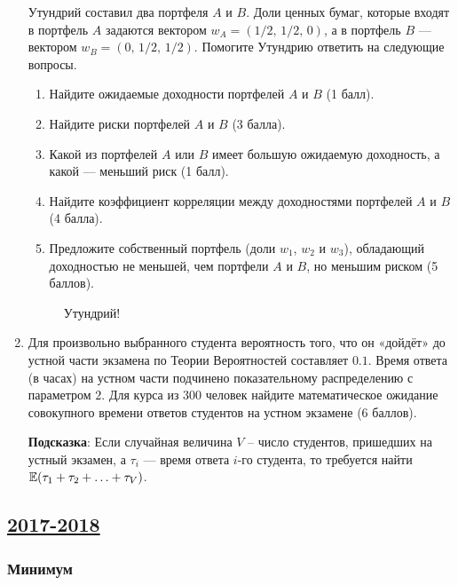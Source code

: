 \begin{enumerate}
Утундрий составил два портфеля $A$ и $B$. Доли ценных бумаг, которые входят
в портфель $A$ задаются вектором $w_A = (1/2, \, 1/2, \, 0)$, а в портфель $B$ —
вектором $w_B = (0, \, 1/2, \, 1/2)$.
Помогите Утундрию ответить на следующие вопросы.
\begin{enumerate}
  \item Найдите ожидаемые доходности портфелей $A$ и $B$ (1 балл).
  \item Найдите риски портфелей $A$ и $B$ (3 балла).
  \item Какой из портфелей $A$ или $B$ имеет большую ожидаемую доходность,
  а какой — меньший риск (1 балл).
  \item Найдите коэффициент корреляции между доходностями портфелей $A$ и $B$ (4 балла).
  \item Предложите собственный портфель (доли $w_{1}$, $w_{2}$ и $w_{3}$),
  обладающий доходностью не меньшей, чем портфели $A$ и $B$, но меньшим риском (5 баллов).
\end{enumerate}

\begin{figure}[h]
    \noindent{}
    \caption{Утундрий!}
    \label{ut2018}
\end{figure}


    \item Для произвольно выбранного студента вероятность того, что он «дойдёт»
    до устной части экзамена по Теории Вероятностей составляет $0.1$. Время
    ответа (в часах) на устном части подчинено показательному распределению с
    параметром $2$. Для курса из $300$ человек найдите математическое ожидание
    совокупного времени ответов студентов на устном экзамене (6 баллов).

    \textbf{Подсказка}: Если случайная величина $V$ – число студентов,
    пришедших на устный экзамен, а $\tau_{i}$ — время ответа $i$-го студента,
    то требуется найти $\operatorname{\mathbb{E}}(\tau_{1}+\tau_{2}+ \ldots +\tau_{V})$.


\end{enumerate}


\newpage
\subsection[2017-2018]{\hyperref[sec:sol_kr_02_2017_2018]{2017-2018}}
\label{sec:kr_02_2017_2018}

\subsubsection*{Минимум}

